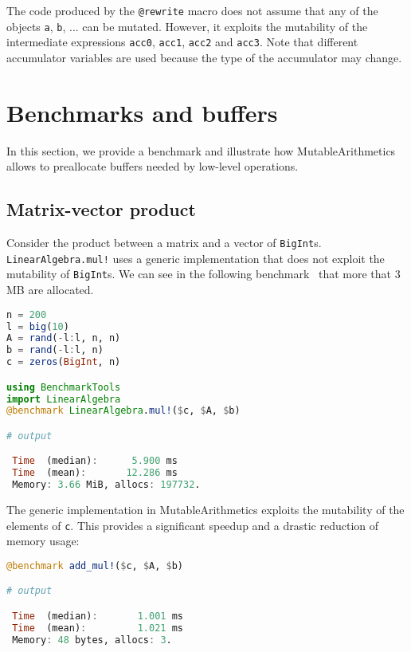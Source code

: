 \documentclass{juliacon}
\newcommand{\ma}{MutableArithmetics}
\begin{document}
The code produced by the \lstinline|@rewrite| macro does not assume
that any of the objects \lstinline|a|, \lstinline|b|, ... can be mutated.
However, it exploits the mutability of the intermediate expressions
\lstinline|acc0|, \lstinline|acc1|, \lstinline|acc2| and \lstinline|acc3|.
Note that different accumulator variables are used because the type of the accumulator may change.

\section{Benchmarks and buffers}
In this section, we provide a benchmark and illustrate
how \ma{} allows to preallocate buffers needed by low-level operations.

\subsection{Matrix-vector product}
Consider the product between a matrix and a vector of \lstinline|BigInt|s.
\lstinline|LinearAlgebra.mul!| uses a generic implementation that does not exploit the mutability of \lstinline|BigInt|s.
We can see in the following benchmark~\cite{BenchmarkTools.jl-2016} that more that 3 MB are allocated.
\begin{lstlisting}[language = Julia]
n = 200
l = big(10)
A = rand(-l:l, n, n)
b = rand(-l:l, n)
c = zeros(BigInt, n)

using BenchmarkTools
import LinearAlgebra
@benchmark LinearAlgebra.mul!($c, $A, $b)

# output

 Time  (median):      5.900 ms
 Time  (mean):       12.286 ms
 Memory: 3.66 MiB, allocs: 197732.
\end{lstlisting}

The generic implementation in \ma{} exploits the mutability of the elements of \lstinline|c|.
This provides a significant speedup and a drastic reduction of memory usage:
\begin{lstlisting}[language = Julia]
@benchmark add_mul!($c, $A, $b)

# output

 Time  (median):       1.001 ms
 Time  (mean):         1.021 ms
 Memory: 48 bytes, allocs: 3.
\end{lstlisting}
\end{document}
